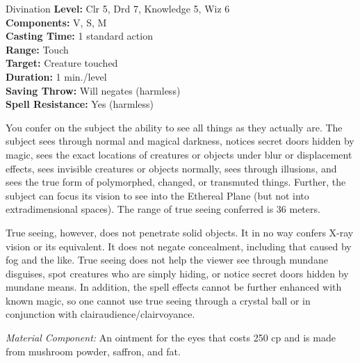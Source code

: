 {Divination}
{
	\textbf{Level:}
	Clr 5, Drd 7, Knowledge 5, Wiz 6\\
	\textbf{Components:}
	V, S, M\\
	\textbf{Casting Time:}
	1 standard action\\
	\textbf{Range:}
	Touch\\
	\textbf{Target:}
	Creature touched\\
	\textbf{Duration:}
	1 min./level\\
	\textbf{Saving Throw:}
	Will negates (harmless)\\
	\textbf{Spell Resistance:}
	Yes (harmless)\\
}
{
	You confer on the subject the ability to see all things as they actually are. The subject sees through normal and magical darkness, notices secret doors hidden by magic, sees the exact locations of creatures or objects under blur or displacement effects, sees invisible creatures or objects normally, sees through illusions, and sees the true form of polymorphed, changed, or transmuted things. Further, the subject can focus its vision to see into the Ethereal Plane (but not into extradimensional spaces). The range of true seeing conferred is 36 meters.

	True seeing, however, does not penetrate solid objects. It in no way confers X-ray vision or its equivalent. It does not negate concealment, including that caused by fog and the like. True seeing does not help the viewer see through mundane disguises, spot creatures who are simply hiding, or notice secret doors hidden by mundane means. In addition, the spell effects cannot be further enhanced with known magic, so one cannot use true seeing through a crystal ball or in conjunction with clairaudience/clairvoyance.

	\textit{Material Component:}
	An ointment for the eyes that costs 250 cp and is made from mushroom powder, saffron, and fat.

}
